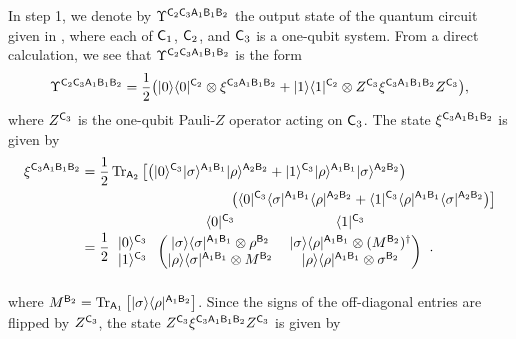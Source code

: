In step 1, we denote by $\Upsilon^{{\mathsf{C}}_2{\mathsf{C}}_3{\mathsf{A}}_1{\mathsf{B}}_1{\mathsf{B}}_2}$ the output state of the quantum circuit given in , where each of ${\mathsf{C}}_1$, ${\mathsf{C}}_2$, and ${\mathsf{C}}_3$ is a one-qubit system.
From a direct calculation, we see that $\Upsilon^{{\mathsf{C}}_2{\mathsf{C}}_3{\mathsf{A}}_1{\mathsf{B}}_1{\mathsf{B}}_2}$ is the form
\begin{align}
\label{inteq:64}
    \Upsilon^{{\mathsf{C}}_2{\mathsf{C}}_3{\mathsf{A}}_1{\mathsf{B}}_1{\mathsf{B}}_2} 
    = \frac{1}{2}\big(|0\rangle\langle0|^{{\mathsf{C}}_2} \otimes \xi^{{\mathsf{C}}_3{\mathsf{A}}_1{\mathsf{B}}_1{\mathsf{B}}_2} 
    + |1\rangle\langle1|^{{\mathsf{C}}_2} \otimes Z^{{\mathsf{C}}_3}\xi^{{\mathsf{C}}_3{\mathsf{A}}_1{\mathsf{B}}_1{\mathsf{B}}_2} Z^{{\mathsf{C}}_3}\big),
\end{align}
where $Z^{{\mathsf{C}}_3}$ is the one-qubit Pauli-$Z$ operator acting on ${\mathsf{C}}_3$.
The state $\xi^{{\mathsf{C}}_3{\mathsf{A}}_1{\mathsf{B}}_1{\mathsf{B}}_2}$ is given by
\begin{align}
    \xi^{\sC_3\sA_1\sB_1\sB_2}
    &= \f{1}{2}\tr_{\sA_2}\big[\big(\ket{0}^{\sC_3}\ket{\sigma}^{\sA_1\sB_1}\ket{\rho}^{\sA_2\sB_2}+\ket{1}^{\sC_3}\ket{\rho}^{\sA_1\sB_1}\ket{\sigma}^{\sA_2\sB_2}\big) \notag \\
    &\hspace{9pc}\big(\bra{0}^{\sC_3}\bra{\sigma}^{\sA_1\sB_1}\bra{\rho}^{\sA_2\sB_2}+\bra{1}^{\sC_3}\bra{\rho}^{\sA_1\sB_1}\bra{\sigma}^{\sA_2\sB_2}\big)\big] \\
    &= \f{1}{2}
\begin{blockarray}{ccc}
& \bra{0}^{\sC_3}&  \bra{1}^{\sC_3} \vspace{1mm}\\
\begin{block}{c(cc)}
  \ket{0}^{\sC_3}\hspace*{1mm} & \ketbra{\sigma}{\sigma}^{\sA_1\sB_1}\otimes\rho^{\sB_2} & \ketbra{\sigma}{\rho}^{\sA_1\sB_1}\otimes (M^{\sB_2})^\dag \\
  \ket{1}^{\sC_3}\hspace*{1mm} & \ketbra{\rho}{\sigma}^{\sA_1\sB_1}\otimes M^{\sB_2} & \ketbra{\rho}{\rho}^{\sA_1\sB_1}\otimes\sigma^{\sB_2} \\
\end{block}
\end{blockarray}\hspace{2.5mm}.
\end{align}
where $M^{{\mathsf{B}}_2} = \operatorname{Tr}_{{\mathsf{A}}_1}\big[|\sigma\rangle\langle\rho|^{{\mathsf{A}}_1{\mathsf{B}}_2}\big]$.
Since the signs of the off-diagonal entries are flipped by $Z^{{\mathsf{C}}_3}$, the state $Z^{{\mathsf{C}}_3}\xi^{{\mathsf{C}}_3{\mathsf{A}}_1{\mathsf{B}}_1{\mathsf{B}}_2}Z^{{\mathsf{C}}_3}$ is given by 
